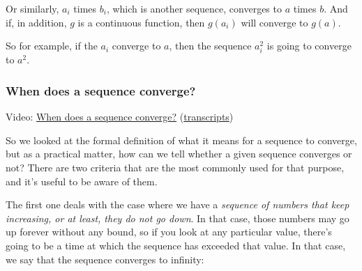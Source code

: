 \documentclass[pdftex, brazil, 12pt, twoside]{article}
\begin{document}
\begin{figure}[H]
  \begin{center}
  \end{center}
\end{figure}

Or similarly, $a_i$ times $b_i$, which is another sequence,
converges to $a$ times $b$.
And if, in addition, $g$ is a continuous function, then $g(a_i)$
will converge to $g(a)$.

\begin{figure}[H]
  \begin{center}
  \end{center}
\end{figure}

So for example, if the $a_i$ converge to $a$, then the
sequence $a_i^2$ is going to converge to $a^2$.

\subsubsection{When does a sequence converge?}
\label{un1-math-sequences-converge}

Video: \href{https://www.youtube.com/watch?v=ekJCcJjyLAI}{When does a sequence converge?}
(\href{Unit-1/02\_mathematical\_background/mb\_5\_transcripts.pdf}{transcripts})

So we looked at the formal definition of what it means
for a sequence to converge, but as a practical matter, how
can we tell whether a given sequence converges or not?
There are two criteria that are the most commonly used for
that purpose, and it's useful to be aware of them.

The first one deals with the case where we have a \emph{sequence
of numbers that keep increasing, or at least, they
do not go down}.
In that case, those numbers may go up forever without any
bound, so if you look at any particular value, there's
going to be a time at which the sequence has
exceeded that value.
In that case, we say that the sequence
converges to infinity:
\end{document}
